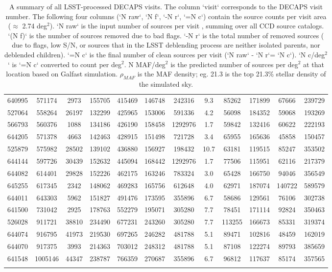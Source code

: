 \documentclass[DM,lsstdraft,toc,usenatbib]{lsstdoc}
\begin{document}
\begin{landscape}
\begin{longtable}{cccccccccccc}
640995 & 571174 & 2973 & 155705 & 415469 & 146748 & 242316 & 9.3 & 85262 & 171899 & 67666 & 239729 \\
527064 & 558264 & 26197 & 132299 & 425965 & 153006 & 591336 & 4.2 & 56098 & 184352 & 59068 & 193269 \\
566793 & 560376 & 1088 & 134186 & 426190 & 158458 & 1292976 & 1.7 & 59842 & 132416 & 60622 & 222193 \\
644205 & 571378 & 4663 & 142463 & 428915 & 151498 & 721728 & 3.4 & 65955 & 165636 & 45858 & 150457 \\
525879 & 575982 & 28502 & 139102 & 436880 & 156927 & 198432 & 10.7 & 63181 & 119515 & 85247 & 353502 \\
644144 & 597726 & 30439 & 152632 & 445094 & 168442 & 1292976 & 1.7 & 77506 & 115951 & 62116 & 217379 \\
644082 & 614401 & 29828 & 152226 & 462175 & 163246 & 783324 & 3.0 & 65428 & 166750 & 94046 & 356549 \\
645255 & 617345 & 2342 & 148062 & 469283 & 165756 & 612648 & 4.0 & 62971 & 187074 & 140722 & 589579 \\
644011 & 643303 & 5962 & 151827 & 491476 & 173595 & 355896 & 6.7 & 58686 & 129561 & 76106 & 302738 \\
641500 & 731042 & 2925 & 178763 & 552279 & 195071 & 305280 & 7.7 & 78451 & 171114 & 92824 & 350463 \\
526028 & 911721 & 38810 & 234490 & 677231 & 243260 & 305280 & 7.7 & 113255 & 166673 & 85331 & 319374 \\
644074 & 916795 & 41973 & 219530 & 697265 & 246282 & 481788 & 5.1 & 89471 & 102816 & 48459 & 162019 \\
644070 & 917375 & 3993 & 214363 & 703012 & 248312 & 481788 & 5.1 & 87108 & 122274 & 89793 & 385659 \\
641548 & 1005146 & 44347 & 238787 & 766359 & 270687 & 355896 & 6.7 & 96812 & 117637 & 85174 & 357565 \\

\hline

\caption{A summary of all LSST-processed DECAPS visits. The column `visit` corresponds to the DECAPS visit number.  The following four columns (`N raw`,  `N f`, `-N r`,  `=N c`) contain the source counts  per visit area ($\approx$ 2.74 deg$^{2}$). `N raw` is the input number of sources per visit , summing over all CCD source catalogs. `(N f)` is the number of sources removed due to bad flags. `-N r` is the total number of removed sources ( due to flags, low S/N, or sources that in the LSST deblending process are neither isolated parents, nor deblended children). `=N c` is the final number of clean sources per  visit (`N raw` - `N r`= `N c`). `N c/deg$^{2}$` is `=N c` converted to count per deg$^{2}$. N MAF/deg$^{2}$ is the predicted number of sources per deg$^{2}$ at that location based on Galfast simulation. $\rho_{MAF}$ is the  MAF density; eg. 21.3 is the top 21.3\% stellar density of the simulated sky.}
\label{tab:lsst_summary}
\end{longtable}
\end{landscape}
\end{document}
